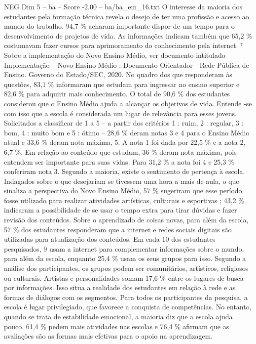 \begin{textsample}{NEG Dim 5 – ba – Score -2.00 – ba/ba\_em\_16.txt}
O interesse da maioria dos estudantes pela formação técnica revela o desejo de ter uma profissão e acesso ao mundo do trabalho. 94,7 \% acharam importante dispor de um tempo para o desenvolvimento de projetos de vida.
As informações indicam também que 65,2 \% costumavam fazer cursos para aprimoramento do conhecimento pela internet. ⁷ Sobre a implementação do Novo Ensino Médio, ver documento intitulado Implementação – Novo Ensino Médio : Documento Orientador - Rede Pública de Ensino.
Governo do Estado/SEC, 2020.
No quadro dos que responderam às questões, 83,1 \% informaram que estudam para ingressar no ensino superior e 82,6 \% para adquirir mais conhecimento.
O total de 90,6 \% dos estudantes considerou que o Ensino Médio ajuda a alcançar os objetivos de vida.
Entende -se com isso que a escola é considerada um lugar de relevância para esses jovens.
Solicitados a classificar de 1 a 5 – a partir dos critérios 1 : ruim, 2 : regular, 3 : bom, 4 : muito bom e 5 : ótimo – 28,6 \% deram notas 3 e 4 para o Ensino Médio atual e 33,6 \% deram nota máxima, 5.
A nota 1 foi dada por 22,5 \% e a nota 2, 6,7 \%.
Em relação ao conteúdo que estudam, 36 \% deram nota máxima, pois entendem ser importante para suas vidas.
Para 31,2 \% a nota foi 4 e 25,3 \% conferiram nota 3.
Segundo a maioria, existe o sentimento de pertença à escola.
Indagados sobre o que desejariam se tivessem uma hora a mais de aula, o que sinaliza a perspectiva do Novo Ensino Médio, 57 \% sugeriram que esse período fosse utilizado para realizar atividades artísticas, culturais e esportivas ; 43,2 \% indicaram a possibilidade de se usar o tempo extra para tirar dúvidas e fazer revisão dos conteúdos.
Sobre o aprendizado de coisas novas, para além da escola, 57 \% dos estudantes responderam que a internet e redes sociais digitais são utilizadas para atualização dos conteúdos.
Em cada 10 dos estudantes pesquisados, 9 usam a internet para complementar informações sobre o mundo, para além da escola, enquanto 25,4 \% usam os seus grupos para isso.
Segundo a análise dos participantes, os grupos podem ser comunitários, artísticos, religiosos ou culturais.
Artistas e personalidades somam 17,6 \% entre os lugares de busca por informações.
Isso situa a realidade dos estudantes em relação à rede e as formas de diálogos com os segmentos.
Para todos os participantes da pesquisa, a escola é lugar privilegiado, que favorece a conquista de competências.
No entanto, quando se trata de estabilidade emocional, a maioria diz que a escola ajuda pouco. 61,4 \% pedem mais atividades nas escolas e 76,4 \% afirmam que as avaliações são as formas mais efetivas para o apoio na aprendizagem.

\end{textsample}
